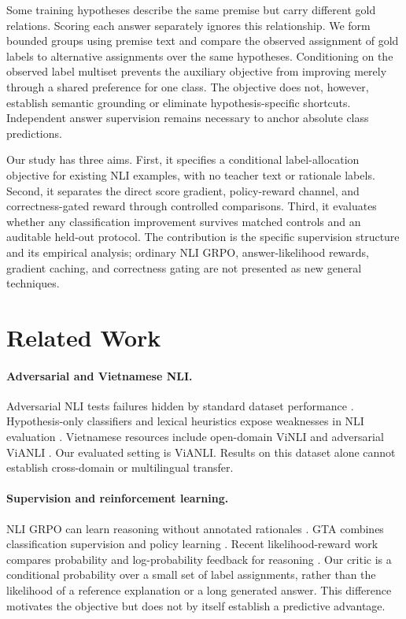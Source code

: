 \documentclass[11pt]{article}
\begin{document}
Some training hypotheses describe the same premise but carry different gold relations. Scoring each answer separately ignores this relationship. We form bounded groups using premise text and compare the observed assignment of gold labels to alternative assignments over the same hypotheses. Conditioning on the observed label multiset prevents the auxiliary objective from improving merely through a shared preference for one class. The objective does not, however, establish semantic grounding or eliminate hypothesis-specific shortcuts. Independent answer supervision remains necessary to anchor absolute class predictions.

Our study has three aims. First, it specifies a conditional label-allocation objective for existing NLI examples, with no teacher text or rationale labels. Second, it separates the direct score gradient, policy-reward channel, and correctness-gated reward through controlled comparisons. Third, it evaluates whether any classification improvement survives matched controls and an auditable held-out protocol. The contribution is the specific supervision structure and its empirical analysis; ordinary NLI GRPO, answer-likelihood rewards, gradient caching, and correctness gating are not presented as new general techniques.

\section{Related Work}
\paragraph{Adversarial and Vietnamese NLI.}
Adversarial NLI tests failures hidden by standard dataset performance \citep{nie-etal-2020-adversarial}. Hypothesis-only classifiers and lexical heuristics expose weaknesses in NLI evaluation \citep{poliak-etal-2018-hypothesis,mccoy-etal-2019-right}. Vietnamese resources include open-domain ViNLI and adversarial ViANLI \citep{huynh-etal-2022-vinli,huynh-etal-2025-vianli}. Our evaluated setting is ViANLI. Results on this dataset alone cannot establish cross-domain or multilingual transfer.

\paragraph{Supervision and reinforcement learning.}
NLI GRPO can learn reasoning without annotated rationales \citep{mirallesgonzalez-etal-2025-grpo-nli}. GTA combines classification supervision and policy learning \citep{zeng-etal-2025-gta}. Recent likelihood-reward work compares probability and log-probability feedback for reasoning \citep{kwiatkowski-etal-2026-likelihood}. Our critic is a conditional probability over a small set of label assignments, rather than the likelihood of a reference explanation or a long generated answer. This difference motivates the objective but does not by itself establish a predictive advantage.
\end{document}
